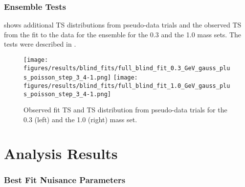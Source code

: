 

\subsection{Ensemble Tests} 

 shows additional TS distributions from pseudo-data trials and the observed TS from the fit to the data for the ensemble for the \SI{0.3}{\gev} and the \SI{1.0}{\gev} mass sets. The tests were described in .

\begin{figure*}[h]
    \texttt{[image: figures/results/blind\_fits/full\_blind\_fit\_0.3\_GeV\_gauss\_plus\_poisson\_step\_3\_4-1.png]}
    \texttt{[image: figures/results/blind\_fits/full\_blind\_fit\_1.0\_GeV\_gauss\_plus\_poisson\_step\_3\_4-1.png]}
	\caption[Pseudo-data trials TS distribution (\SI{0.3}{\gev}, \SI{1.0}{\gev})]{Observed fit TS and TS distribution from pseudo-data trials for the \SI{0.3}{\gev} (left) and the \SI{1.0}{\gev} (right) mass set.}
\end{figure*}


\chapter{Analysis Results}


\subsection{Best Fit Nuisance Parameters}

